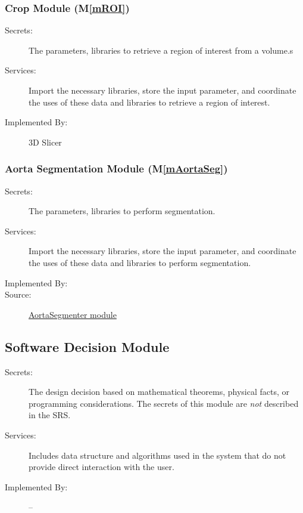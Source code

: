 \documentclass[12pt, titlepage]{article}
\newcommand{\mref}[1]{M\ref{#1}}
\begin{document}
\subsubsection{Crop Module (\mref{mROI})}
\begin{description}
\item[Secrets:] The parameters, libraries to retrieve a region of interest from a volume.s
\item[Services:] Import the necessary libraries, store the input parameter, and coordinate the uses of these data and libraries to retrieve a region of interest.
\item[Implemented By:] 3D Slicer
\end{description}

\subsubsection{Aorta Segmentation Module (\mref{mAortaSeg})}
\begin{description}
\item[Secrets:] The parameters, libraries to perform segmentation.
\item[Services:] Import the necessary libraries, store the input parameter, and coordinate the uses of these data and libraries to perform segmentation.
\item[Implemented By:] \progname
\item[Source:] \href{https://joviel25.github.io/AortaGR-design-document/AortaGeomReconDisplayModuleLib.html#module-AortaSegmenter}{AortaSegmenter module}
\end{description}

\subsection{Software Decision Module}

\begin{description}
\item[Secrets:] The design decision based on mathematical theorems, physical
  facts, or programming considerations. The secrets of this module are
  \emph{not} described in the SRS.
\item[Services:] Includes data structure and algorithms used in the system that
  do not provide direct interaction with the user. 
\item[Implemented By:] --
\end{description}
\end{document}
